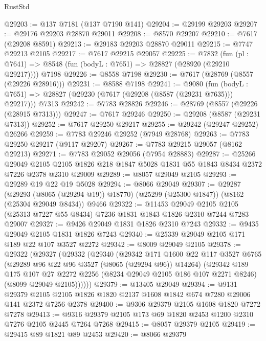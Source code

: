 \begin{lexlean}{RustStd}
\begin{coremodule}
@29203 := @137 @7181 (@137 @7190 @141)
@29204 := @29199 @29203
@29207 := @29176 @29203 @28870 @29011
@29208 := @8570 @29207
@29210 := @7617 (@29208 @8591)
@29213 := @29183 @29203 @28870 @29011
@29215 := @7747 @29213 @2105
@29217 := @7617 @29215 @29057
@29225 := @7832
    (fun (pl : @7641) => @8548 (fun (bodyL : @7651) => @28827 (@28920 (@29210 @29217))))
    @7198
@29226 := @8558 @7198
@29230 := @7617 (@28769 (@8557 (@29226 @28916)))
@29231 := @8588 @7198
@29241 := @9080
    (fun (bodyL : @7651) => @28827 (@29230 (@7617 (@29208 (@8587 (@29231 @7635))) @29217)))
    @7313
@29242 := @7783 @28826
@29246 := @28769 (@8557 (@29226 (@28915 @7313)))
@29247 := @7617 @29246
@29250 := @29208 (@8587 (@29231 @7313))
@29252 := @7617 @29250 @29217
@29255 := @29242 (@29247 @29252) @26266
@29259 := @7783 @29246 @29252 (@7949 @28768)
@29263 := @7783 @29250 @29217 (@9117 @29207)
@29267 := @7783 @29215 @29057 (@8162 @29213)
@29271 := @7783 @29052 @29056 (@7954 @28883)
@29287 := @25266
    @29049
    @2105
    @2105
    @1826
    @218
    @1847
    @5028
    @1831
    @55
    @1843
    @8434
    @2372
    @7226
    @2378
    @2310
    @29009
@29289 := @8057 @29049 @2105
@29293 := @29289 @19 @22 @19 @5028
@29294 := @8066 @29049
@29307 := @29287
    (@29293 (@8065 (@29294 @19)) @18770)
    (@25299 (@25300 @1847))
    (@8162 (@25304 @29049 @8434))
    @9466
@29322 := @11453
    @29049
    @2105
    @2105
    (@25313 @7227 @55 @8434)
    @7236
    @1831
    @1843
    @1826
    @2310
    @7244
    @7283
    @29007
@29327 := @9426 @29049 @1831 @1826 @2310 @7243
@29332 := @9435 @29049 @2105 @1831 @1826 @7243
@29340 := @25339 @29049 @2105 @171 @189 @22 @107 @3527 @2272
@29342 := @8009 @29049 @2105
@29378 := @29322
    (@29327
      (@29332
        (@29340
          (@29342
            @171
            @1600
            @22
            @117
            @3527
            @6765
            (@29289 @96 @22 @96 @3527 (@8065 (@29294 @96)) @14264)
            (@29342
              @189
              @175
              @107
              @27
              @2272
              @2256
              (@8234 @29049 @2105 @186 @107 @2271 @8246)
              (@8099 @29049 @2105))))))
@29379 := @13405 @29049
@29394 := @9131
    @29379
    @2105
    @2105
    @1826
    @1820
    @2137
    @1608
    @1842
    @674
    @7280
    @29006
    @141
    @2372
    @7256
    @2378
@29400 := @9306 @29379 @2105 @1608 @1820 @7272 @7278
@29413 := @9316 @29379 @2105 @173 @69 @1820 @2453 @1200 @2310 @7276 @2105 @2445 @7264 @7268
@29415 := @8057 @29379 @2105
@29419 := @29415 @89 @1821 @89 @2453
@29420 := @8066 @29379

\end{coremodule}
\end{lexlean}
